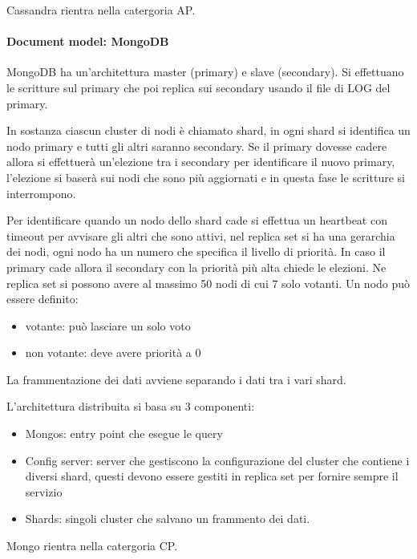 Cassandra rientra nella catergoria AP.
\paragraph{Document model: MongoDB}
MongoDB ha un'architettura master (primary) e slave (secondary). 
Si effettuano le scritture sul primary che poi replica sui secondary usando il 
file di LOG del primary.

In sostanza ciascun cluster di nodi è chiamato shard, in ogni shard si identifica un nodo primary 
e tutti gli altri saranno secondary. Se il primary dovesse cadere allora si effettuerà
un'elezione tra i secondary per identificare il nuovo primary, l'elezione si 
baserà sui nodi che sono più aggiornati e in questa fase le scritture si interrompono.

Per identificare quando un nodo dello shard cade si effettua un heartbeat con timeout
per avvisare gli altri che sono attivi, nel replica set si ha una gerarchia dei 
nodi, ogni nodo ha un numero che specifica il livello di priorità. In caso il 
primary cade allora il secondary con la priorità più alta chiede le elezioni. 
Ne replica set si possono avere al massimo 50 nodi di cui $7$ solo votanti.
Un nodo può essere definito:
\begin{itemize}
      \item votante: può lasciare un solo voto
      \item non votante: deve avere priorità a $0$
\end{itemize}

La frammentazione dei dati avviene separando i dati tra i vari shard. 

L'architettura distribuita si basa su 3 componenti:
\begin{itemize}
      \item Mongos: entry point che esegue le query
      \item Config server: server che gestiscono la configurazione del cluster che
      contiene i diversi shard, questi devono essere gestiti in replica set per 
      fornire sempre il servizio
      \item Shards: singoli cluster che salvano un frammento dei dati.
\end{itemize}

Mongo rientra nella catergoria CP.
